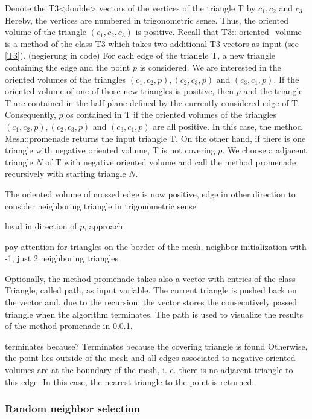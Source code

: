 \documentclass[10pt]{article}
\begin{document}
Denote the {\ttfamily T3<double>} vectors of the vertices of the triangle {\ttfamily T} by $c_1,c_2$ and $c_3$. Hereby, the vertices are numbered in trigonometric sense. Thus, the oriented volume of the triangle $(c_1,c_2,c_3)$ is positive. Recall that {\ttfamily T3:: oriented\_volume} is a method of the class {\ttfamily T3} which takes two additional {\ttfamily T3} vectors as input (see \ref{T3}). (negierung in code) For each edge of the triangle {\ttfamily T}, a new triangle containing the edge and the point $p$ is considered. We are interested in the oriented volumes of the triangles $(c_1,c_2,p), (c_2,c_3,p)$ and $(c_3,c_1,p)$. If the oriented volume of one of those new triangles is positive, then $p$ and the triangle {\ttfamily T} are contained in the half plane defined by the currently considered edge of {\ttfamily T}. Consequently, $p$ os contained in {\ttfamily T} if the oriented volumes of the triangles $(c_1,c_2,p), (c_2,c_3,p)$ and $(c_3,c_1,p)$ are all positive. In this case, the method {\ttfamily Mesh::promenade} returns the input triangle {\ttfamily T}. On the other hand, if there is one triangle with negative oriented volume, {\ttfamily T} is not covering $p$. We choose a adjacent triangle $N$ of {\ttfamily T} with negative oriented volume and call the method promenade recursively with starting triangle $N$.

The oriented volume of crossed edge is now positive, edge in other direction to consider neighboring triangle in trigonometric sense

head in direction of $p$, approach

pay attention for triangles on the border of the mesh. neighbor initialization with -1, just 2 neighboring triangles

Optionally, the method promenade takes also a vector with entries of the class Triangle, called path, as input variable. The current triangle is pushed back on the vector and, due to the recursion, the vector stores the consecutively passed triangle when the algorithm terminates. The path is used to visualize the results of the method promenade in \ref{}.

terminates because?
Terminates because the covering triangle is found 
Otherwise, the point lies outside of the mesh and all edges associated to negative oriented volumes are at the  boundary of the mesh, i. e. there is no adjacent triangle to this edge. In this case, the nearest triangle to the point is returned. 

\subsubsection{Random neighbor selection}
\end{document}
